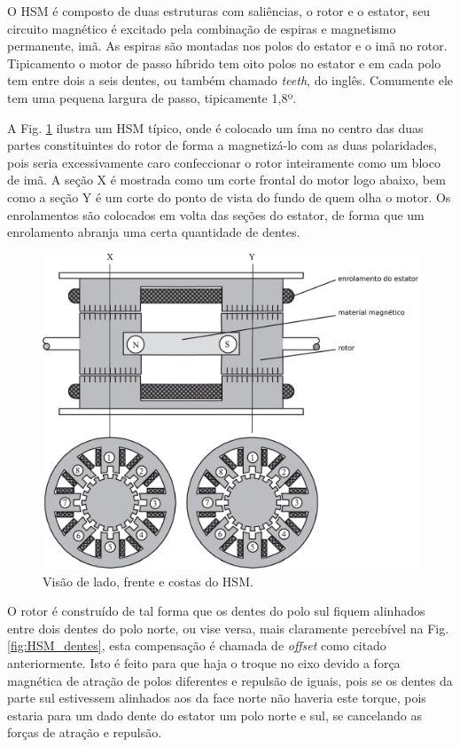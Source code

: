 O HSM é composto de duas estruturas com saliências, o rotor e o estator, seu circuito magnético é excitado pela combinação de espiras e magnetismo permanente, imã. As espiras são montadas nos polos do estator e o imã no rotor. Tipicamento o motor de passo híbrido tem oito polos no estator e em cada polo tem entre dois a seis dentes, ou também chamado \emph{teeth}, do inglês. Comumente ele tem uma pequena largura de passo, tipicamente 1,8º. 

A Fig. \ref{fig:estrutura_HSM} ilustra um HSM típico, onde é colocado um íma no centro das duas partes constituintes do rotor de forma a magnetizá-lo com as duas polaridades, pois seria excessivamente caro confeccionar o rotor inteiramente como um bloco de imã. A seção X é mostrada como um corte frontal do motor logo abaixo, bem como a seção Y é um corte do ponto de vista do fundo de quem olha o motor. Os enrolamentos são colocados em volta das seções do estator, de forma que um enrolamento abranja uma certa quantidade de dentes. \cite{SteppingBook}

\begin{figure}[H]
	\centering
	\includegraphics[width = \columnwidth]{Images/estrutura_HSM.pdf}
	\caption{Visão de lado, frente e costas do HSM. \cite{SteppingBook}}
	\label{fig:estrutura_HSM}
\end{figure}

O rotor é construído de tal forma que os dentes do polo sul fiquem alinhados entre dois dentes do polo norte, ou vise versa, mais claramente percebível na Fig. \ref{fig:HSM_dentes}, esta compensação é chamada de \textit{offset} como citado anteriormente. Isto é feito para que haja o troque no eixo devido a força magnética de atração de polos diferentes e repulsão de iguais, pois se os dentes da parte sul estivessem alinhados aos da face norte não haveria este torque, pois estaria para um dado dente do estator um polo norte e sul, se cancelando as forças de atração e repulsão.

